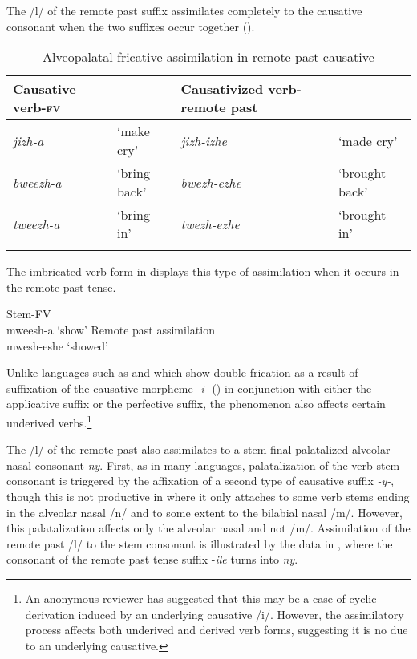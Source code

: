 \documentclass[output=paper]{langsci/langscibook}
\begin{document}
The /l/ of the remote past suffix assimilates completely to the causative consonant when the two suffixes occur together ().


\begin{table}
\begin{tabularx}{\textwidth}{p{2cm}Xp{3cm}X}
\lsptoprule
Causative verb-\textsc{fv} &  & Causativized \newline verb-remote past & \\
\midrule
\textit{jizh-a} & `make cry' & \textit{jizh-izhe} & `made cry' \\
\textit{bweezh-a} & `bring back' & \textit{bwezh-ezhe} & `brought back' \\
\textit{tweezh-a} & `bring in' & \textit{twezh-ezhe} & `brought in' \\

\lspbottomrule
\end{tabularx}

\caption{Alveopalatal fricative assimilation in remote past causative}
\label{tab:7.kawasha}

 \end{table}


The imbricated verb form in  displays this type of assimilation when it occurs in the remote past tense. 


\ea\label{ex:4.kawasha}
   \ea\label{ex:4a.kawasha} {Stem-FV}\\
mweesh-a ‘show’
    \ex\label{ex:4b.kawasha} {Remote past assimilation}\\
mwesh-eshe ‘showed'
\z
\z 


Unlike languages such as  and  which show double frication as a result of suffixation of the causative morpheme \textit{-i-} (\citealt{hyman1995,hyman2003}) in conjunction with either the applicative suffix or the perfective suffix, the phenomenon also affects certain underived verbs.\footnote{An anonymous reviewer has suggested that this may be a case of cyclic derivation induced by an underlying causative /i/. However, the  assimilatory process affects both underived and derived verb forms, suggesting it is no due to an underlying causative.}

 
The /l/ of the remote past also assimilates to a stem final palatalized alveolar nasal consonant \textit{ny}. First, as in many  languages, palatalization of the verb stem consonant is triggered by the affixation of a second type of causative suffix \textit{-y-}, though this is not productive in  where it only attaches to some verb stems ending in the alveolar nasal /n/ and to some extent to the bilabial nasal /m/. However, this palatalization affects only the alveolar nasal and not /m/. Assimilation of the remote past /l/ to the stem consonant is illustrated by the data in , where the consonant of the remote past tense suffix -\textit{ile} turns into \textit{ny}.  
 
\end{document}
